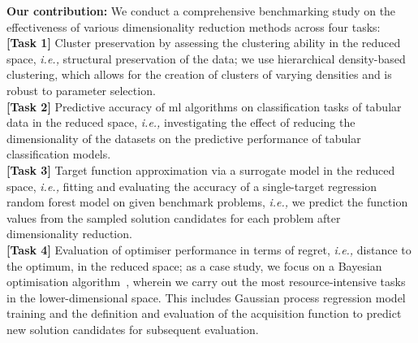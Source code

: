 \textbf{Our contribution:} We conduct a comprehensive benchmarking study on the effectiveness of various dimensionality reduction methods across four tasks:\\
\textbf{[Task 1]}
    Cluster preservation by assessing the clustering ability in the reduced space, \emph{i.e.,} structural preservation of the data;
    we use hierarchical density-based clustering, which allows for the creation of clusters of varying densities and is
    robust to parameter selection.\\
    \textbf{[Task 2]}
    Predictive accuracy of \gls{ml} algorithms on classification tasks of tabular data in the reduced space, \emph{i.e.,} investigating the effect of reducing the dimensionality of the datasets on the predictive performance of tabular classification models. \\
    \textbf{[Task 3]}
    Target function approximation via a surrogate model
    in the reduced space, \emph{i.e.,} fitting and evaluating the accuracy of a single-target regression random forest model on given benchmark problems, \emph{i.e.,} we predict the function values from the sampled solution candidates for each problem after dimensionality reduction.\\
    \textbf{[Task 4]} Evaluation of optimiser performance in terms of regret, \emph{i.e.,} distance to the optimum, in the reduced space; as a case study, we focus on a Bayesian optimisation algorithm~\citep{Mockus89b,Garnett23}, wherein we carry out the most resource-intensive tasks in the lower-dimensional space.
    This includes Gaussian process regression model training and the definition and evaluation of the acquisition function to predict new solution candidates for subsequent evaluation.

